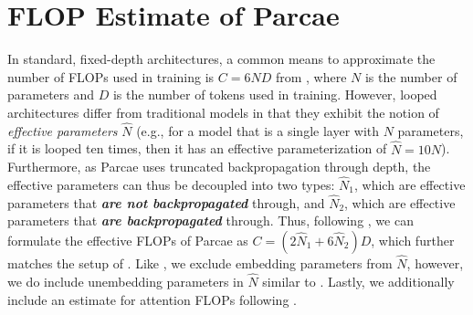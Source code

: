 \section{FLOP Estimate of Parcae}
\label{sec:flop-estimate}


In standard, fixed-depth architectures, a common means to approximate the number of FLOPs used in training is $C = 6ND$ from \citet{kaplan2020scalinglawsneurallanguage}, where $N$ is the number of parameters and $D$ is the number of tokens used in training. However, looped architectures differ from traditional models in that they exhibit the notion of \emph{effective parameters} $\hat N$ (e.g., for a model that is a single layer with $N$ parameters, if it is looped ten times, then it has an effective parameterization of $\hat N = 10 N$). Furthermore, as Parcae uses truncated backpropagation through depth, the effective parameters can thus be decoupled into two types: $\hat N_1$, which are effective parameters that \emph{\textbf{are not backpropagated}} through, and $\hat N_2$, which are effective parameters that \emph{\textbf{are backpropagated}} through. Thus, following \citet{kaplan2020scalinglawsneurallanguage}, we can formulate the effective FLOPs of Parcae as $C = (2\hat N_1 + 6 \hat N_2)D$, which further matches the setup of \citet{mcleish_retrofitted_recurrence}. Like \citet{mcleish_retrofitted_recurrence}, we exclude embedding parameters from $\hat N$, however, we do include unembedding parameters in $\hat N$ similar to \citet{nanochat}. Lastly, we additionally include an estimate for attention FLOPs following \citet{chowdhery2022palmscalinglanguagemodeling,nanochat}.
